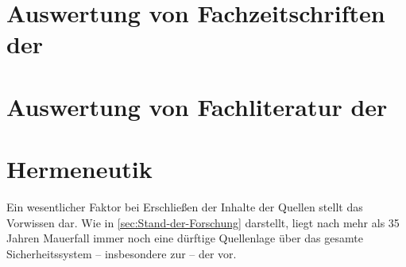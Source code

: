 
\section{Auswertung von Fachzeitschriften der }\label{sec::auswertung-fachzeitschriften}
\section{Auswertung von Fachliteratur der }\label{sec::auswertung-fachliteratur}
\section{Hermeneutik}
Ein wesentlicher Faktor bei Erschließen der Inhalte der Quellen stellt das Vorwissen dar.
Wie in \cref{sec:Stand-der-Forschung} darstellt, liegt nach mehr als 35 Jahren Mauerfall immer noch eine dürftige Quellenlage über das gesamte Sicherheitssystem -- insbesondere zur  -- der  vor.




%

